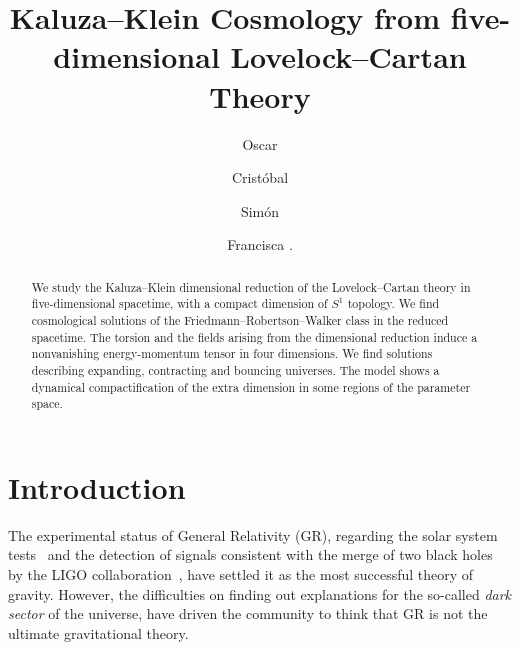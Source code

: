 \documentclass[aps,prd,12pt,superscriptaddress,showpacs,showkeys,longbibliography,reprint,nofootinbib]{revtex4-1}
\begin{document}
\title{Kaluza--Klein Cosmology from five-dimensional Lovelock--Cartan Theory}

\author{Oscar }

\author{Crist\'obal }

\author{Sim\'on }

\author{Francisca .}


\begin{abstract}
  We study the Kaluza--Klein dimensional reduction of the Lovelock--Cartan theory in five-dimensional spacetime, with a compact dimension of $S^1$ topology. We find cosmological solutions of the Friedmann--Robertson--Walker class in the reduced spacetime. The torsion and the fields arising from the dimensional reduction induce a nonvanishing energy-momentum tensor in four dimensions. We find solutions describing expanding, contracting and bouncing universes. The model shows a dynamical compactification of the extra dimension in some regions of the parameter space. 
\end{abstract}



\maketitle

\section{Introduction}


The experimental status of General Relativity (GR), regarding the solar system tests~\cite{Will:2014kxa} and the detection of signals consistent with the merge of two black holes by the LIGO collaboration~\cite{Abbott:2016blz,*Abbott:2016nmj}, have settled it as the most successful theory of gravity. However, the difficulties on finding out explanations for the so-called \emph{dark sector} of the universe, have driven the community to think that GR is not the ultimate gravitational theory. 
\end{document}
